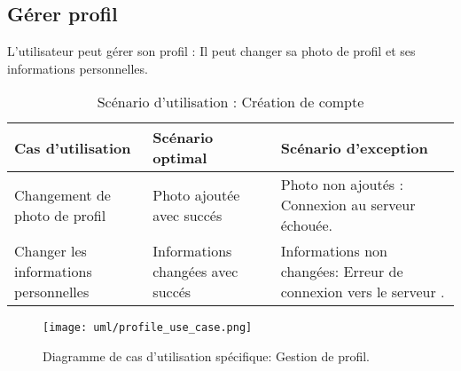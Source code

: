 \subsection{Gérer profil}
L'utilisateur peut gérer son profil : Il peut changer sa photo de profil et ses informations personnelles.
\begin{table}[H]
    \begin{center}
        \begin{tabularx}{\textwidth} {
                | >{\centering\arraybackslash}X
                | >{\centering\arraybackslash}X
                | >{\centering\arraybackslash}X |}
            \hline
            Cas d'utilisation                     & Scénario optimal                  & Scénario d'exception                                             \\
            \hline
            Changement de photo de profil         & Photo ajoutée avec succés         & Photo non ajoutés : Connexion au serveur échouée.                \\
            \hline
            Changer les informations personnelles & Informations changées avec succés & Informations non changées: Erreur de connexion vers le serveur . \\
            \hline
        \end{tabularx}
        \captionsetup{justification=centering}
        \caption{Scénario d'utilisation : Création de compte}
        \label{tab:profile_update_scenario}
    \end{center}
\end{table}
\begin{figure}[H]
    \centering
    \texttt{[image: uml/profile\_use\_case.png]}
    \vspace{1cm}
    \captionsetup{justification=centering}
    \caption{Diagramme de cas d'utilisation spécifique: Gestion de profil.}
    \label{fig:use_case_manage_profile}
\end{figure}
